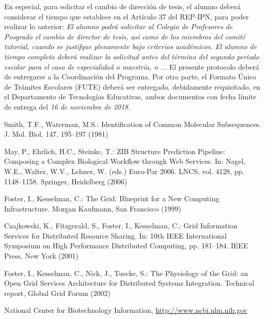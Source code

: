 \documentclass[runningheads,a4paper]{book}
\begin{document}
En especial, para solicitar el cambio de dirección de tesis, el alumno deberá considerar el tiempo que establece en el Artículo 37 del REP-IPN, para poder realizar lo anterior:
\newline
\newline
\emph{El alumno podrá solicitar al Colegio de Profesores de Posgrado el cambio de director de tesis, así como de los miembros del comité tutorial, cuando se justifque plenamente bajo criterios académicos. El alumno de tiempo completo deberá realizar la solicitud antes del término del segundo periodo escolar para el caso de especialidad o maestría, o ...}
\newline
\newline
El presente protocolo deberá de entregarse a la Coordinación del Programa. Por otra parte, el Formato Único de Trámites Escolares (FUTE) deberá ser entregado, debidamente requisitado, en el Departamento de Tecnologías Educativas, ambos documentos con fecha límite de entrega del \emph{16 de noviembre de 2018.}





\begin{thebibliography}{4}

 Smith, T.F., Waterman, M.S.: Identification of Common Molecular
Subsequences. J. Mol. Biol. 147, 195--197 (1981)

 May, P., Ehrlich, H.C., Steinke, T.: ZIB Structure Prediction Pipeline:
Composing a Complex Biological Workflow through Web Services. In: Nagel,
W.E., Walter, W.V., Lehner, W. (eds.) Euro-Par 2006. LNCS, vol. 4128,
pp. 1148--1158. Springer, Heidelberg (2006)

 Foster, I., Kesselman, C.: The Grid: Blueprint for a New Computing
Infrastructure. Morgan Kaufmann, San Francisco (1999)

 Czajkowski, K., Fitzgerald, S., Foster, I., Kesselman, C.: Grid
Information Services for Distributed Resource Sharing. In: 10th IEEE
International Symposium on High Performance Distributed Computing, pp.
181--184. IEEE Press, New York (2001)

 Foster, I., Kesselman, C., Nick, J., Tuecke, S.: The Physiology of the
Grid: an Open Grid Services Architecture for Distributed Systems
Integration. Technical report, Global Grid Forum (2002)

 National Center for Biotechnology Information, \url{http://www.ncbi.nlm.nih.gov}

\end{thebibliography}
\end{document}
